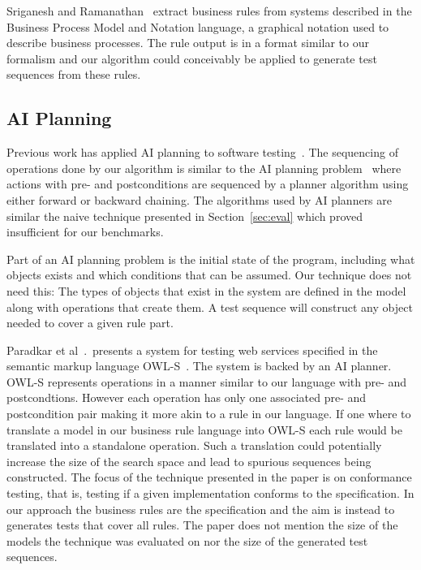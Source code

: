 Sriganesh and Ramanathan~\cite{sriganesh2012} extract business rules
from systems described in the Business Process Model and Notation
language, a graphical notation used to describe business
processes. The rule output is in a format similar to our formalism and
our algorithm could conceivably be applied to generate test sequences
from these rules.

\subsection{AI Planning}

Previous work has applied AI planning to software
testing~\cite{Scheetz99ai,Howe97testcase}. The sequencing of
operations done by our algorithm is similar to the AI planning
problem~\cite{Weld94} where actions with pre- and postconditions are sequenced
by a planner algorithm using either forward or backward chaining. The
algorithms used by AI planners are similar the naive technique
presented in Section~\ref{sec:eval} which proved insufficient for our
benchmarks. 

Part of an AI planning problem is the initial state of the program,
including what objects exists and which conditions that can be
assumed. Our technique does not need this: The types of objects that
exist in the system are defined in the model along with operations
that create them. A test sequence will construct any object needed to
cover a given rule part.

Paradkar et al~\cite{conf/icws/ParadkarSWJOSL07}.\ presents a system
for testing web services specified in the semantic markup language
OWL-S~\cite{owls}. The system is backed by an AI planner. OWL-S represents
operations in a manner similar to our language with pre- and
postcondtions. However each operation has only one associated pre- and
postcondition pair making it more akin to a rule in our language. If
one where to translate a model in our business rule language into
OWL-S each rule would be translated into a standalone operation. Such
a translation could potentially increase the size of the search space
and lead to spurious sequences being constructed. The focus of the
technique presented in the paper is on conformance testing, that is,
testing if a given implementation conforms to the specification. In
our approach the business rules are the specification and the aim is
instead to generates tests that cover all rules. The paper does not
mention the size of the models the technique was evaluated on nor the
size of the generated test sequences.
